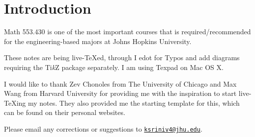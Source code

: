 \documentclass[11pt]{article}
\author{Lectures by \lecturer\\ Notes by \notetaker}
\title{\coursetitle}
\date{\institution\\ \courseterm}
\makeatletter
\newcommand{\notetakersemail}{ksriniv4@jhu.edu}
\newcounter{lecture}       \setcounter{lecture}{-1}
\theoremstyle{definition}
\makeatother
\begin{document}
	

\maketitle
{}
\thispagestyle{empty}
\setcounter{page}{-1}
\vspace{0.3in}



%
\begin{center}
\begin{minipage}[t]{0.9\textwidth}
\begin{multicols}{2}
\tableofcontents
\end{multicols}
\end{minipage}
\end{center}



\newpage
\thispdfpagelabel{-}
\thispagestyle{empty}


\section*{Introduction}
Math 553.430 is one of the most important courses that is required/recommended for the engineering-based majors at Johns Hopkins University.

These notes are being live-TeXed, through I edot for Typos and add diagrams requiring the Ti\textit{k}Z package separately. I am using Texpad on Mac OS X.

I would like to thank Zev Chonoles from The University of Chicago and Max Wang from Harvard University for providing me with the inspiration to start live-TeXing my notes. They also provided me the starting template for this, which can be found on their personal websites.

Please email any corrections or suggestions to \expandafter\href{mailto:\notetakersemail}{\texttt{\notetakersemail}}.
	
	
\newpage








	
\end{document}
